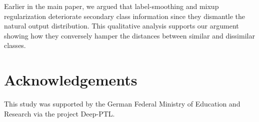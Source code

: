 \documentclass[final]{cvpr}
\begin{document}
Earlier in the main paper, we argued that label-smoothing and mixup regularization deteriorate secondary class information since they dismantle the natural output distribution. This qualitative analysis supports our argument showing how they conversely hamper the distances between similar and dissimilar classes.








 


\section*{Acknowledgements} This study was supported by the German Federal Ministry of Education and Research via the project Deep-PTL.
\end{document}
